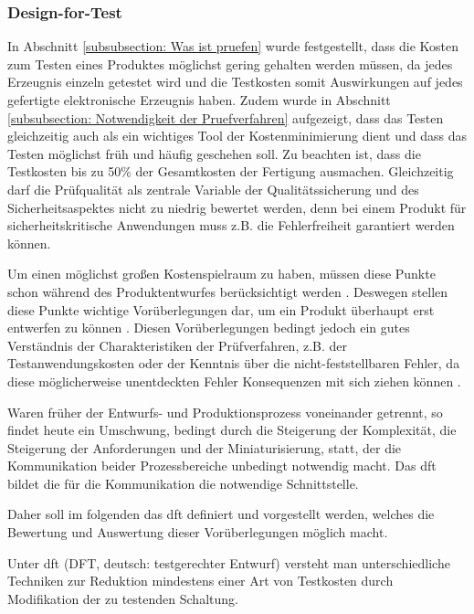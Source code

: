 \subsubsection{Design-for-Test}
    In Abschnitt \ref{subsubsection: Was ist pruefen} wurde festgestellt, dass die Kosten zum Testen eines Produktes möglichst gering gehalten werden müssen, da jedes Erzeugnis einzeln getestet wird und die Testkosten somit Auswirkungen auf jedes gefertigte elektronische Erzeugnis haben.
    Zudem wurde in Abschnitt \ref{subsubsection: Notwendigkeit der Pruefverfahren} aufgezeigt, dass das Testen gleichzeitig auch als ein wichtiges Tool der Kostenminimierung dient und dass das Testen möglichst früh und häufig geschehen soll. 
    Zu beachten ist, dass die Testkosten bis zu 50\% der Gesamtkosten der Fertigung ausmachen.
    Gleichzeitig darf die Prüfqualität als zentrale Variable der Qualitätssicherung und des Sicherheitsaspektes nicht zu niedrig bewertet werden, denn bei einem Produkt für sicherheitskritische Anwendungen muss z.B. die Fehlerfreiheit garantiert werden können. \cite{eggersglus_test_2014}

    Um einen möglichst großen Kostenspielraum zu haben, müssen diese Punkte schon während des Produktentwurfes berücksichtigt werden \cite{eggersglus_test_2014}.
    Deswegen stellen diese Punkte wichtige Vorüberlegungen dar, um ein Produkt überhaupt erst entwerfen zu können \cite{grout_integrated_2006}.
    Diesen Vorüberlegungen bedingt jedoch ein gutes Verständnis der Charakteristiken der Prüfverfahren, z.B. der Testanwendungskosten oder der Kenntnis über die nicht-feststellbaren Fehler, da diese möglicherweise unentdeckten Fehler Konsequenzen mit sich ziehen können \cite{eggersglus_test_2014}.

    Waren früher der Entwurfs- und Produktionsprozess voneinander getrennt, so findet heute ein Umschwung, bedingt durch die Steigerung der Komplexität, die Steigerung der Anforderungen und der Miniaturisierung, statt, der die Kommunikation beider Prozessbereiche unbedingt notwendig macht.
    Das \acl{dft} bildet die für die Kommunikation die notwendige Schnittstelle. \cite{grout_integrated_2006}

    Daher soll im folgenden das \acl{dft} definiert und vorgestellt werden, welches die Bewertung und Auswertung dieser Vorüberlegungen möglich macht.

    \begin{center}
        \begin{minipage}{0.75\textwidth}
                Unter \acl{dft} (DFT, deutsch: testgerechter Entwurf) versteht man unterschiedliche Techniken zur Reduktion mindestens einer Art von Testkosten durch Modifikation der zu testenden Schaltung. \cite{eggersglus_test_2014}
        \end{minipage}
    \end{center}

